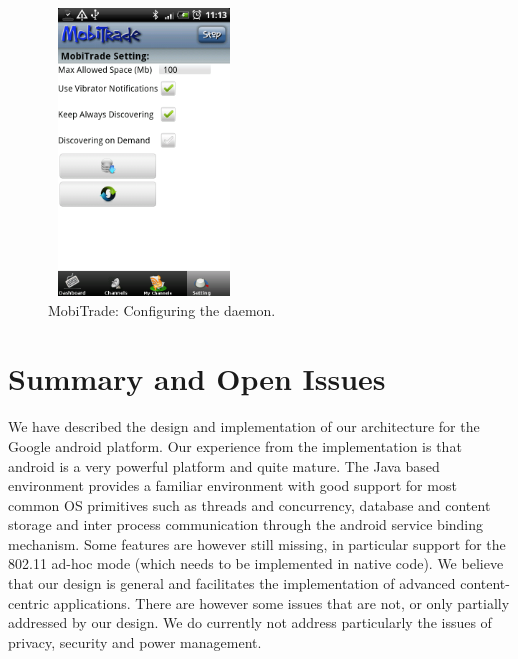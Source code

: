 \begin{figure}[!h]
\begin{center}
\includegraphics[width=2in,height=3in]{Chapitre6/Config.png}
\end{center}
\caption{MobiTrade: Configuring the daemon.}
\label{Config}
\end{figure}

\section{Summary and Open Issues}
\label{MobiTradeSoftSummary}

We have described the design and implementation of our architecture for the Google android platform. Our experience from the implementation is that android is a very powerful platform and quite mature. The Java based environment provides a familiar environment with good support for most common OS primitives such as threads and concurrency, database and content storage and inter process communication through the android service binding mechanism. Some features are however still missing, in particular support for the 802.11 ad-hoc mode (which needs to be implemented in native code). We believe that our design is general and facilitates the implementation of 
advanced content-centric applications. There are however some issues that are not, or only partially addressed by our design. We do currently not address particularly the issues of privacy, security and power management.
